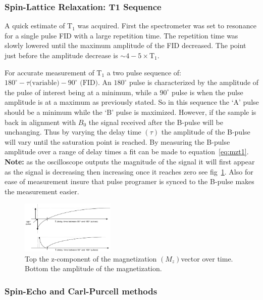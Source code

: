 \documentclass[
reprint,
amsmath,amssymb,
aps,
tikz,
border=5pt
]{revtex4-1}
\begin{document}
\subsubsection*{Spin-Lattice Relaxation: T1 Sequence}


    A quick estimate of T$_1$ was acquired. First the spectrometer was set to resonance for a single pulse FID with a large repetition time. The repetition time was slowly lowered until the maximum amplitude of the FID decreased. The point just before the amplitude decrease is $\sim 4-5\times$T$_1$.

    For accurate measurement of T$_1$ a two pulse sequence of: $180^{\circ}- \tau \text{(variable)} - 90^{\circ}\text{ (FID)}$. An $180^{\circ}$ pulse is characterized by the amplitude of the pulse of interest being at a minimum, while a $90^{\circ}$ pulse is when the pulse amplitude is at a maximum as previously stated. So in this sequence the `A' pulse should be a minimum while the `B' pulse is maximized. However, if the sample is back in alignment with $B_0$ the signal received after the B-pulse will be unchanging. Thus by varying the delay time $(\tau )$ the amplitude of the B-pulse will vary until the saturation point is reached. By measuring the B-pulse amplitude over a range of delay times a fit can be made to equation~\ref{eq:mzt1}. \textbf{Note:} as the oscilloscope outputs the magnitude of the signal it will first appear as the signal is decreasing then increasing once it reaches zero see fig~\ref{fig:magnetization_t1}. Also for ease of measurement insure that pulse programer is synced to the B-pulse makes the measurement easier. 

    \begin{center}
        \begin{figure}[b]
            \includegraphics[width=0.4\textwidth]{figures/t1_pulse_magnetization.png}
            \caption{Top the z-component of the magnetization $(M_z)$vector over time. Bottom the amplitude of the magnetization.}
            \label{fig:magnetization_t1}
          \end{figure}
    \end{center}

\subsubsection*{Spin-Echo and Carl-Purcell methods}
\end{document}
